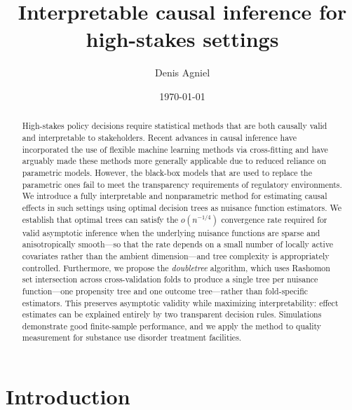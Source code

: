 \documentclass[12pt]{article}
\title{Interpretable causal inference for high-stakes settings}
\author{Denis Agniel}
\date{\today}
\begin{document}
\maketitle
\begin{abstract}
    High-stakes policy decisions require statistical methods that are both causally valid and interpretable to stakeholders. Recent advances in causal inference have incorporated the use of flexible machine learning methods via cross-fitting and have arguably made these methods more generally applicable due to reduced reliance on parametric models. However, the black-box models that are used to replace the parametric ones fail to meet the transparency requirements of regulatory environments. We introduce a fully interpretable and nonparametric method for estimating causal effects in such settings using optimal decision trees as nuisance function estimators. We establish that optimal trees can satisfy the $o(n^{-1/4})$ convergence rate required for valid asymptotic inference when the underlying nuisance functions are sparse and anisotropically smooth---so that the rate depends on a small number of locally active covariates rather than the ambient dimension---and tree complexity is appropriately controlled. Furthermore, we propose the \textit{doubletree} algorithm, which uses Rashomon set intersection across cross-validation folds to produce a single tree per nuisance function---one propensity tree and one outcome tree---rather than fold-specific estimators. This preserves asymptotic validity while maximizing interpretability: effect estimates can be explained entirely by two transparent decision rules. Simulations demonstrate good finite-sample performance, and we apply the method to quality measurement for substance use disorder treatment facilities.
\end{abstract}

\section{Introduction}
\end{document}
